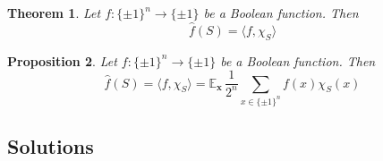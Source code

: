 \documentclass[11pt]{article}
\numberwithin{equation}{section}
\newtheorem{thm}{Theorem}[section]
\newtheorem{prop}[thm]{Proposition}
\theoremstyle{definition}
\begin{document}
\begin{thm}\label{thm:fourier_expansion}
	Let $f:\{\pm 1\}^n \to \{\pm 1\}$ be a Boolean function. Then
	$$\hat{f}(S) = \langle f, \chi_S \rangle$$
\end{thm}

\begin{prop}\label{fourier_coef}
Let $f:\{\pm 1\}^n \to \{\pm 1\}$ be a Boolean function. Then
	$$\hat{f}(S) = \langle f, \chi_S \rangle = \mathbb{E}_{\bm{x} ~ } \frac{1}{2^n} \sum_{x \in \{\pm 1\}^n} f(x) \chi_S(x)$$
\end{prop}

\clearpage

\subsection*{Solutions}
\end{document}
